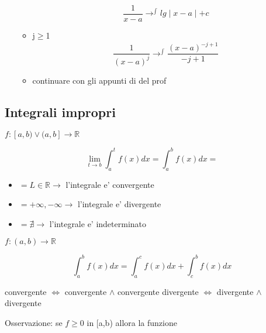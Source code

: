\documentclass{article}
\begin{document}
\begin{enumerate}
\begin{itemize}
                  \begin{equation*}
                    \frac{1}{x-a} \to^{\int} lg \mid x-a \mid +c
                  \end{equation*}
                \item j$\geq$1 
                  \begin{equation*}
                    \frac{1}{(x-a)^j} \to^{\int} \frac{(x-a)^{-j+1}}{-j+1}
                  \end{equation*}
                \item continuare con gli appunti di del prof
              \end{itemize}
          \end{enumerate}
          \subsection{Integrali impropri}
          \begin{flushleft}
            $f:[a,b) \lor (a,b] \to \mathbb{R}$
          \end{flushleft}
          \begin{equation*}
            \lim_{t \to b} \int_a^t f(x)dx=\int^b_a f(x)dx=
          \end{equation*}
          \begin{itemize}
            \item $=L\in \mathbb{R} \to $ l'integrale e' convergente
            \item $=+\infty,-\infty \to $ l'integrale e' divergente 
            \item $=\nexists\to $ l'integrale e' indeterminato
          \end{itemize}
          \begin{flushleft}
            $f:(a,b) \to \mathbb{R}$
          \end{flushleft}
          \begin{equation*}
            \int_a^b f(x)dx=\int^c_a f(x)dx + \int^b_c f(x)dx
          \end{equation*}
          \begin{flushleft}
            convergente $\iff$ convergente $\land$ convergente 
            divergente $\iff$ divergente $\land$ divergente
          \end{flushleft}
          \begin{flushleft}
            Osservazione: se $f\geq 0$ in [a,b) allora la funzione
          \end{flushleft}
\end{document}
